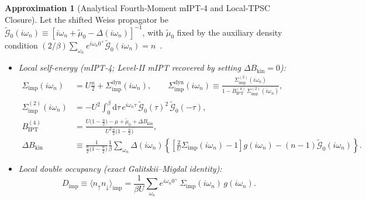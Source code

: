 \documentclass[11pt,a4paper]{article}
\numberwithin{equation}{section}
\theoremstyle{plain}
\theoremstyle{definition}
\newtheorem{approximation}{Approximation}[section]
\providecommand{\dd}{\mathrm{d}}
\begin{document}
\begin{approximation}[Analytical Fourth-Moment mIPT-4 and Local-TPSC Closure]
Let the shifted Weiss propagator be
$\tilde{\mathcal{G}}_0(i\omega_n) \equiv [i\omega_n + \tilde{\mu}_0 - \Delta(i\omega_n)]^{-1}$,
with $\tilde{\mu}_0$ fixed by the auxiliary density condition
$(2/\beta)\sum_{\omega_n} e^{i\omega_n 0^+}\tilde{\mathcal{G}}_0(i\omega_n) = n$~\cite{Kajueter1996,Potthoff1997,Vilk1997}.
\begin{itemize}
    \item[(i)] \emph{Local self-energy (mIPT-4; Level-II mIPT recovered by setting $\Delta B_{\mathrm{kin}} = 0$):}
    \begin{align}
        \Sigma_{\mathrm{imp}}(i\omega_n)
        &= U\frac{n}{2} + \Sigma_{\mathrm{imp}}^{\mathrm{dyn}}(i\omega_n),
        \qquad
        \Sigma_{\mathrm{imp}}^{\mathrm{dyn}}(i\omega_n)
        \equiv \frac{\Sigma_{\mathrm{imp}}^{(2)}(i\omega_n)}
                    {1 - B_{\mathrm{IPT}}^{(4)}\,\Sigma_{\mathrm{imp}}^{(2)}(i\omega_n)},
        \label{eq:mIPT4} \\
        \Sigma_{\mathrm{imp}}^{(2)}(i\omega_n)
        &= -U^2 \int_0^\beta \dd\tau\, e^{i\omega_n\tau}\,
           \tilde{\mathcal{G}}_0(\tau)^2\,\tilde{\mathcal{G}}_0(-\tau),
        \label{eq:Sigma2_imp} \\
        B_{\mathrm{IPT}}^{(4)}
        &= \frac{U\bigl(1 - \frac{n}{2}\bigr) - \mu + \tilde{\mu}_0 + \Delta B_{\mathrm{kin}}}
                {U^2 \frac{n}{2}\bigl(1 - \frac{n}{2}\bigr)},
        \label{eq:BIPT4} \\
        \Delta B_{\mathrm{kin}}
        &\equiv \frac{1}{\frac{n}{2}\bigl(1 - \frac{n}{2}\bigr)}
                \frac{1}{\beta}\sum_{\omega_n} \Delta(i\omega_n)
                \left\{ \left[\frac{2}{U}\Sigma_{\mathrm{imp}}(i\omega_n) - 1\right] g(i\omega_n)
                        - (n - 1)\tilde{\mathcal{G}}_0(i\omega_n) \right\}.
        \label{eq:Delta_Bkin}
    \end{align}

    \item[(ii)] \emph{Local double occupancy (exact Galitskii--Migdal identity):}
    \begin{equation}
        D_{\mathrm{imp}} \equiv \langle n_\uparrow n_\downarrow \rangle_{\mathrm{imp}}
        = \frac{1}{\beta U}\sum_{\omega_n} e^{i\omega_n 0^+}\,
          \Sigma_{\mathrm{imp}}(i\omega_n)\, g(i\omega_n).
        \label{eq:D_imp}
    \end{equation}


\end{itemize}
\end{approximation}
\end{document}
